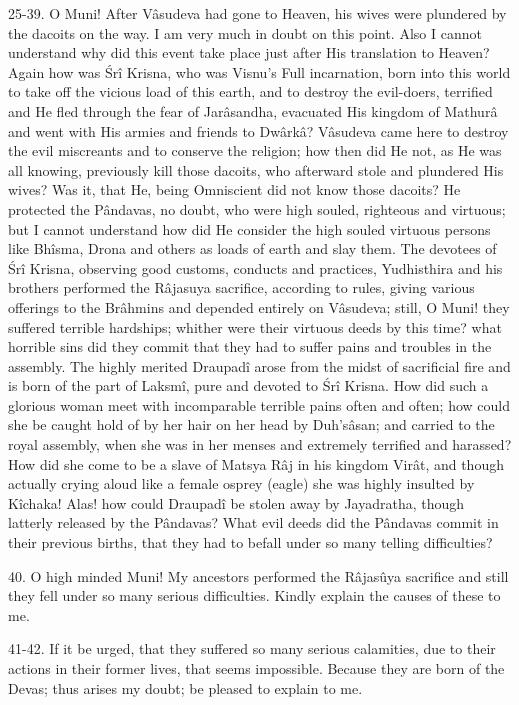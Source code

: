 25-39. O Muni! After V\^asudeva had gone to Heaven, his wives were plundered by the dacoits on the way. I am very much in doubt on this point. Also I cannot understand why did this event take place just after His translation to Heaven? Again how was \'Sr\^i Krisna, who was Visnu's Full incarnation, born into this world to take off the vicious load of this earth, and to destroy the evil-doers, terrified and He fled through the fear of Jar\^asandha, evacuated His kingdom of Mathur\^a and went with His armies and friends to Dw\^ark\^a? V\^asudeva came here to destroy the evil miscreants and to conserve the religion; how then did He not, as He was all knowing, previously kill those dacoits, who afterward stole and plundered His wives? Was it, that He, being Omniscient did not know those dacoits? He protected the P\^andavas, no doubt, who were high souled, righteous and virtuous; but I cannot understand how did He consider the high souled virtuous persons like Bh\^isma, Drona and others as loads of earth and slay them. The devotees of \'Sr\^i Krisna, observing good customs, conducts and practices, Yudhisthira and his brothers performed the R\^ajasuya sacrifice, according to rules, giving various offerings to the Br\^ahmins and depended entirely on V\^asudeva; still, O Muni! they suffered terrible hardships; whither were their virtuous deeds by this time? what horrible sins did they commit that they had to suffer pains and troubles in the assembly. The highly merited Draupad\^i arose from the midst of sacrificial fire and is born of the part of Laksm\^i, pure and devoted to \'Sr\^i Krisna. How did such a glorious woman meet with incomparable terrible pains often and often; how could she be caught hold of by her hair on her head by Duh's\^asan; and carried to the royal assembly, when she was in her menses and extremely terrified and harassed? How did she come to be a slave of Matsya R\^aj in his kingdom Vir\^at, and though actually crying aloud like a female osprey (eagle) she was highly insulted by K\^ichaka! Alas! how could Draupad\^i be stolen away by Jayadratha, though latterly released by the P\^andavas? What evil deeds did the P\^andavas commit in their previous births, that they had to befall under so many telling difficulties?

40. O high minded Muni! My ancestors performed the R\^ajasûya sacrifice and still they fell under so many serious difficulties. Kindly explain the causes of these to me.

41-42. If it be urged, that they suffered so many serious calamities, due to their actions in their former lives, that seems impossible. Because they are born of the Devas; thus arises my doubt; be pleased to explain to me.

